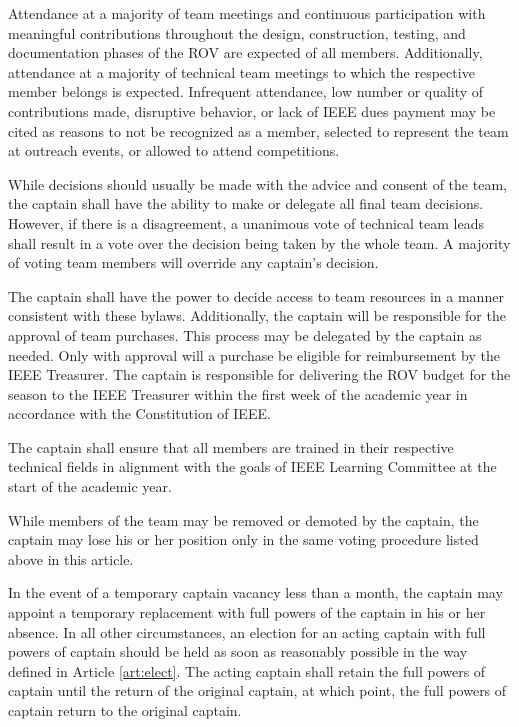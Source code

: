 \documentclass[12pt]{constitution}
\begin{document}
Attendance at a majority of team meetings and continuous participation with meaningful contributions throughout the design, construction, testing, and documentation phases of the ROV are expected of all members. Additionally, attendance at a majority of technical team meetings to which the respective member belongs is expected. Infrequent attendance, low number or quality of contributions made, disruptive behavior, or lack of IEEE dues payment may be cited as reasons to not be recognized as a member, selected to represent the team at outreach events, or allowed to attend competitions.


\label{art:decide}

While decisions should usually be made with the advice and consent of the team, the captain shall have the ability to make or delegate all final team decisions. However, if there is a disagreement, a unanimous vote of technical team leads shall result in a vote over the decision being taken by the whole team. A majority of voting team members will override any captain's decision.

The captain shall have the power to decide access to team resources in a manner consistent with these bylaws. Additionally, the captain will be responsible for the approval of team purchases. This process may be delegated by the captain as needed. Only with approval will a purchase be eligible for reimbursement by the IEEE Treasurer. The captain is responsible for delivering the ROV budget for the season to the IEEE Treasurer within the first week of the academic year in accordance with the Constitution of IEEE.

The captain shall ensure that all members are trained in their respective technical fields in alignment with the goals of IEEE Learning Committee at the start of the academic year.

While members of the team may be removed or demoted by the captain, the captain may lose his or her position only in the same voting procedure listed above in this article.

In the event of a temporary captain vacancy less than a month, the captain may appoint a temporary replacement with full powers of the captain in his or her absence. In all other circumstances, an election for an acting captain with full powers of captain should be held as soon as reasonably possible in the way defined in Article \ref{art:elect}. The acting captain shall retain the full powers of captain until the return of the original captain, at which point, the full powers of captain return to the original captain.
\end{document}
